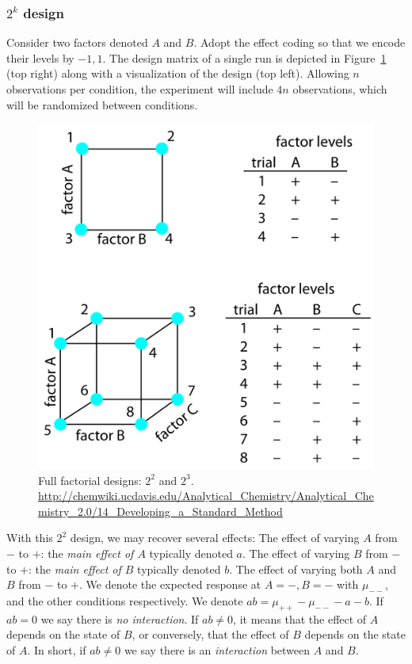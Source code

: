 \subsubsection{$2^k$ design}
Consider two factors denoted $A$ and $B$.
Adopt the effect coding so that we encode their levels by $-1,1$.
The design matrix of a single run is depicted in Figure~\ref{fig:full_factorial} (top right) along with a visualization of the design (top left).
Allowing $n$ observations per condition, the experiment will include $4n$ observations, which will be randomized between conditions.
\begin{figure}[ht]
\centering
\includegraphics[width=0.7\linewidth, height=0.3\textheight]{art/full_factorial}
\caption{Full factorial designs: $2^2$ and $2^3$. \newline \url{http://chemwiki.ucdavis.edu/Analytical_Chemistry/Analytical_Chemistry_2.0/14_Developing_a_Standard_Method}}
\label{fig:full_factorial}
\end{figure}
With this $2^2$ design, we may recover several effects:
The effect of varying $A$ from $-$ to $+$: the \emph{main effect of $A$} typically denoted $a$. 
The effect of varying $B$ from $-$ to $+$: the \emph{main effect of $B$} typically denoted $b$.  
The effect of varying both $A$ and $B$ from $-$ to $+$. 
We denote the expected response at $A=-,B=-$ with $\mu_{--}$, and the other conditions respectively.
We denote $ab=\mu_{++}-\mu_{--}-a-b$.
If $ab=0$ we say there is \emph{no interaction}.
If $ab \neq 0$, it means that the effect of $A$ depends on the state of $B$, or conversely, that the effect of $B$ depends on the state of $A$.  In short, if $ab \neq 0$ we say there is an \emph{interaction} between $A$ and $B$. 

